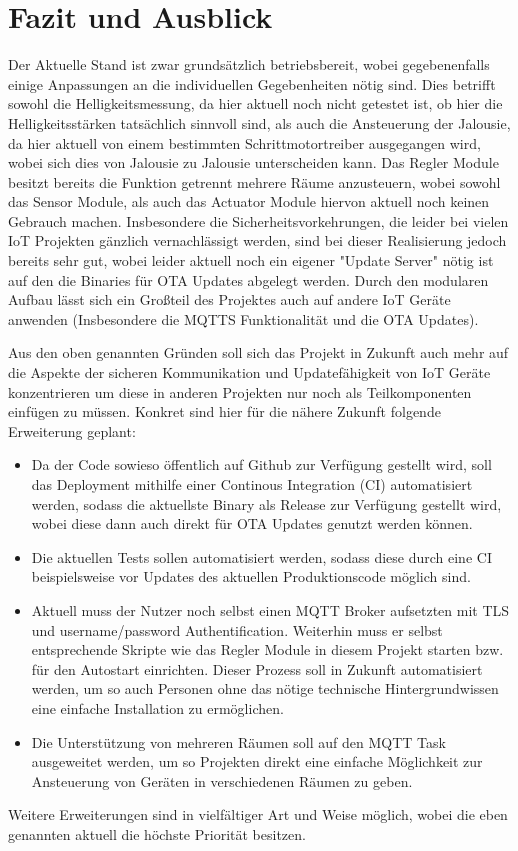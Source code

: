 \chapter{Fazit und Ausblick}
\label{cha:Fazit und Ausblick}

Der Aktuelle Stand ist zwar grundsätzlich betriebsbereit, wobei gegebenenfalls einige Anpassungen an die individuellen Gegebenheiten nötig sind. Dies betrifft sowohl die Helligkeitsmessung, da hier aktuell noch nicht getestet ist, ob hier die Helligkeitsstärken tatsächlich sinnvoll sind, als auch die Ansteuerung der Jalousie, da hier aktuell von einem bestimmten Schrittmotortreiber ausgegangen wird, wobei sich dies von Jalousie zu Jalousie unterscheiden kann. Das Regler Module besitzt bereits die Funktion getrennt mehrere Räume anzusteuern, wobei sowohl das Sensor Module, als auch das Actuator Module hiervon aktuell noch keinen Gebrauch machen. Insbesondere die Sicherheitsvorkehrungen, die leider bei vielen IoT Projekten gänzlich vernachlässigt werden, sind bei dieser Realisierung jedoch bereits sehr gut, wobei leider aktuell noch ein eigener "Update Server" nötig ist auf den die Binaries für OTA Updates abgelegt werden. Durch den modularen Aufbau lässt sich ein Großteil des Projektes auch auf andere IoT Geräte anwenden (Insbesondere die MQTTS Funktionalität und die OTA Updates).

Aus den oben genannten Gründen soll sich das Projekt in Zukunft auch mehr auf die Aspekte der sicheren Kommunikation und Updatefähigkeit von IoT Geräte konzentrieren um diese in anderen Projekten nur noch als Teilkomponenten einfügen zu müssen. Konkret sind hier für die nähere Zukunft folgende Erweiterung geplant:

\begin{itemize}
	\item Da der Code sowieso öffentlich auf Github zur Verfügung gestellt wird, soll das Deployment mithilfe einer Continous Integration (CI) automatisiert werden, sodass die aktuellste Binary als Release zur Verfügung gestellt wird, wobei diese dann auch direkt für OTA Updates genutzt werden können.
	\item Die aktuellen Tests sollen automatisiert werden, sodass diese durch eine CI beispielsweise vor Updates des aktuellen Produktionscode möglich sind.
	\item Aktuell muss der Nutzer noch selbst einen MQTT Broker aufsetzten mit TLS und username/password Authentification. Weiterhin muss er selbst entsprechende Skripte wie das Regler Module in diesem Projekt starten bzw. für den Autostart einrichten. Dieser Prozess soll in Zukunft automatisiert werden, um so auch Personen ohne das nötige technische Hintergrundwissen eine einfache Installation zu ermöglichen.
	\item Die Unterstützung von mehreren Räumen soll auf den MQTT Task ausgeweitet werden, um so Projekten direkt eine einfache Möglichkeit zur Ansteuerung von Geräten in verschiedenen Räumen zu geben.
\end{itemize}

Weitere Erweiterungen sind in vielfältiger Art und Weise möglich, wobei die eben genannten aktuell die höchste Priorität besitzen.